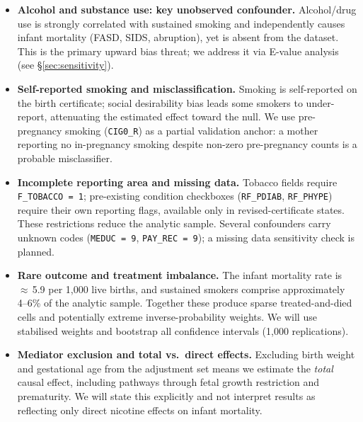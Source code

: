 \documentclass[11pt]{article}
\begin{document}
\begin{itemize}[noitemsep, topsep=2pt, leftmargin=*]
  \item \textbf{Alcohol and substance use: key unobserved confounder.} Alcohol/drug use is strongly correlated with sustained smoking and independently causes infant mortality (FASD, SIDS, abruption), yet is absent from the dataset. This is the primary upward bias threat; we address it via E-value analysis (see \S\ref{sec:sensitivity}).

  \item \textbf{Self-reported smoking and misclassification.} Smoking is self-reported on the birth certificate; social desirability bias leads some smokers to under-report, attenuating the estimated effect toward the null. We use pre-pregnancy smoking (\texttt{CIG0\_R}) as a partial validation anchor: a mother reporting no in-pregnancy smoking despite non-zero pre-pregnancy counts is a probable misclassifier.

  \item \textbf{Incomplete reporting area and missing data.} Tobacco fields require \texttt{F\_TOBACCO\,=\,1}; pre-existing condition checkboxes (\texttt{RF\_PDIAB}, \texttt{RF\_PHYPE}) require their own reporting flags, available only in revised-certificate states. These restrictions reduce the analytic sample. Several confounders carry unknown codes (\texttt{MEDUC\,=\,9}, \texttt{PAY\_REC\,=\,9}); a missing data sensitivity check is planned.

  \item \textbf{Rare outcome and treatment imbalance.} The infant mortality rate is $\approx$\,5.9 per 1,000 live births, and sustained smokers comprise approximately 4--6\% of the analytic sample. Together these produce sparse treated-and-died cells and potentially extreme inverse-probability weights. We will use stabilised weights and bootstrap all confidence intervals (1,000 replications).

  \item \textbf{Mediator exclusion and total vs.\ direct effects.} Excluding birth weight and gestational age from the adjustment set means we estimate the \emph{total} causal effect, including pathways through fetal growth restriction and prematurity. We will state this explicitly and not interpret results as reflecting only direct nicotine effects on infant mortality.

\end{itemize}

\end{document}
